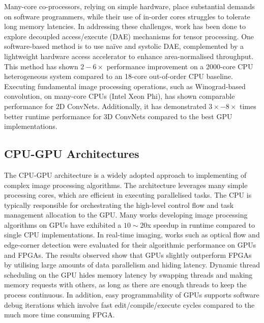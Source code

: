 Many-core co-processors, relying on simple hardware, place substantial demands on software programmers, while their use of in-order cores struggles to tolerate long memory latencies. In addressing these challenges, work has been done to explore decoupled access/execute (DAE) mechanisms for tensor processing. One software-based method is to use naïve and systolic DAE, complemented by a lightweight hardware access accelerator to enhance area-normalised throughput. This method has shown $2-6\times$ performance improvement on a 2000-core CPU heterogeneous system compared to an 18-core out-of-order CPU baseline\cite{ChPanZha22}. Executing fundamental image processing operations, such as Winograd-based convolution, on many-core CPUs (Intel Xeon Phi), has shown comparable performance for 2D ConvNets. Additionally, it has demonstrated $3\times-8\times$ times better runtime performance for 3D ConvNets compared to the best GPU implementations\cite{JiaAlekDur18}.





\subsection{CPU-GPU Architectures}
The CPU-GPU architecture is a widely adopted approach to implementing of complex image processing algorithms. The architecture leverages many simple processing cores, which are efficient in executing parallelised tasks. The CPU is typically responsible for orchestrating the high-level control flow and task management allocation to the GPU. Many works developing image processing algorithms on GPUs\cite{DanDomAnd08,YuWeiDav19,ParkSingLee11} have exhibited a $10\sim20$x speedup in runtime compared to single CPU implementations. In real-time imaging, works such as optical flow\cite{ChaNelBren08} and edge-corner detection\cite{PosRicMah14} were evaluated for their algorithmic performance on GPUs and FPGAs. The results observed show that GPUs slightly outperform FPGAs by utilising large amounts of data parallelism and hiding latency. Dynamic thread scheduling on the GPU hides memory latency by swapping threads and making memory requests with others, as long as there are enough threads to keep the process continuous. In addition, easy programmability of GPUs supports software debug iterations which involve fast edit/compile/execute cycles compared to the much more time consuming FPGA\cite{CheShuLi08}.



